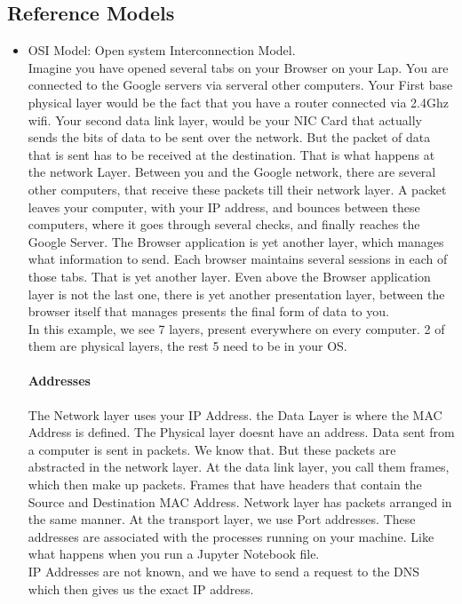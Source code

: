 \documentclass[11pt]{article}
\begin{document}
\subsection{Reference Models}
\begin{itemize}
	\item OSI Model: Open system Interconnection Model. \\
	Imagine you have opened several tabs on your Browser on your Lap. You are connected to the Google servers via serveral other computers. Your First base physical layer would be the fact that you have a router connected via 2.4Ghz wifi. Your second data link layer, would be your NIC Card that actually sends the bits of data to be sent over the network. 
	But the packet of data that is sent has to be received at the destination. That is what happens at the network Layer. Between you and the Google network, there are several other computers, that receive these packets till their network layer. A packet leaves your computer, with your IP address, and bounces between these computers, where it goes through several checks, and finally reaches the Google Server.  
	The Browser application is yet another layer, which manages what information to send. Each browser maintains several sessions in each of those tabs. That is yet another layer.  
	Even above the Browser application layer is not the last one, there is yet another presentation layer, between the browser itself that manages presents the final form of data to you.\\
	In this example, we see 7 layers, present everywhere on every computer. 2 of them are physical layers, the rest 5 need to be in your OS. 

	\paragraph{Addresses}
	The Network layer uses your IP Address. the Data Layer is where the MAC Address is defined. The Physical layer doesnt have an address. Data sent from a computer is sent in packets. We know that. But these packets are abstracted in the network layer. At the data link layer, you call them frames, which then make up packets. Frames that have headers that contain the Source and Destination MAC Address. Network layer has packets arranged in the same manner. At the transport layer, we use Port addresses. These addresses are associated with the processes running on your machine. Like what happens when you run a Jupyter Notebook file. \\ IP Addresses are not known, and we have to send a request to the DNS which then gives us the exact IP address. 
\end{itemize}
\end{document}
